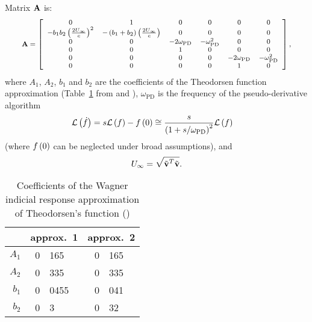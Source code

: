 Matrix $\bm{\mathbf{A}}$ is:
\begin{equation}
	\footnotesize
	\bm{\mathbf{A}} = \left[
		\begin{array}{cccccc}
		0 & 1 & 0 & 0 & 0 & 0\\
		-b_1 b_2 \left(  \frac{2U_\infty}{c} \right)^2 & -\left(  b_1 + b_2 \right) \left( \frac{2 U_\infty}{c} \right)&
 		0 & 0 & 0 & 0 \\
		0 & 0 & -2\omega_\text{PD} & -\omega_\text{PD}^2 & 0 & 0\\
		0 & 0 & 1 & 0 & 0 & 0\\
		0 & 0 & 0 & 0 &-2\omega_\text{PD} & -\omega_\text{PD}^2 \\
		0 & 0 & 0 & 0 & 1 & 0
		\end{array}
		\right],
\end{equation}
where $A_1$, $A_2$, $b_1$ and $b_2$ are the coefficients of the Theodorsen
function approximation (Table~\ref{tab:aero:unsteady:theodorsen-coeffs}
from \cite{BIELAWA92} and \cite{LEISHMAN-2006}),
$\omega_\text{PD}$ is the frequency of the pseudo-derivative algorithm
\begin{align}
	\mathcal{L}\left( \dot{f} \right)
	&= s \mathcal{L}\left( f \right) - f\left( 0 \right)
	\cong \frac{s}{\left( 1 + s/\omega_\text{PD} \right)^2} \mathcal{L}\left( f \right)
\end{align}
(where $f\left( 0 \right)$ can be neglected under broad assumptions),
and
\begin{equation}
U_\infty = \sqrt{\tilde{\bm{\mathbf{v}}}^T\tilde{\bm{\mathbf{v}}}}.
\end{equation}

\begin{table}
\centering
\caption{Coefficients of the Wagner indicial response approximation
of Theodorsen's function (\cite{BIELAWA92,LEISHMAN-2006})}
\label{tab:aero:unsteady:theodorsen-coeffs}
\begin{tabular}{r|r@{.}lr@{.}l}
& \multicolumn{2}{c}{approx.~1} & \multicolumn{2}{c}{approx.~2} \\
\hline
$A_1$ 	& 0&165		& 0&165 \\
$A_2$ 	& 0&335		& 0&335 \\
$b_1$ 	& 0&0455	& 0&041 \\
$b_2$	& 0&3		& 0&32
\end{tabular}
\end{table}

